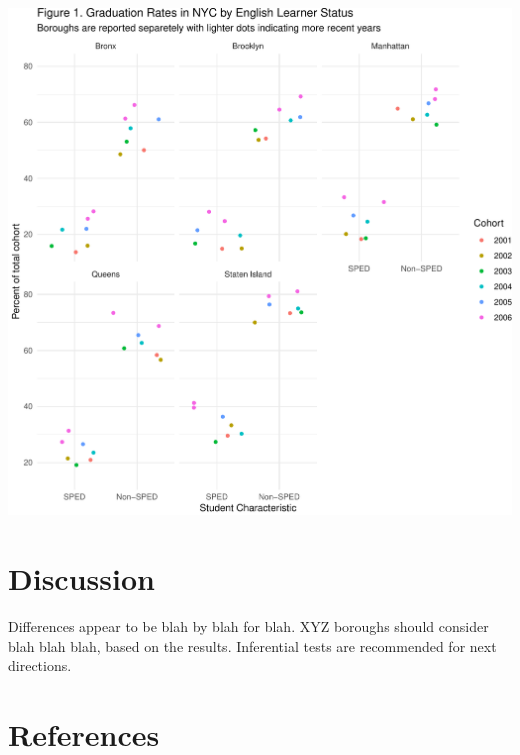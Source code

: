 \documentclass[
  english,
  man, fleqn, noextraspace]{apa6}
\begin{document}
\includegraphics{EDLD_651_Final_Project_Draft_files/figure-latex/graph_results2-1.pdf}

\hypertarget{discussion}{%
\section{Discussion}\label{discussion}}

Differences appear to be blah by blah for blah. XYZ boroughs should consider blah blah blah, based on the results. Inferential tests are recommended for next directions.

\newpage

\hypertarget{references}{%
\section{References}\label{references}}

\begingroup
\setlength{\parindent}{-0.5in}
\setlength{\leftskip}{0.5in}

\hypertarget{refs}{}

\endgroup
\end{document}
